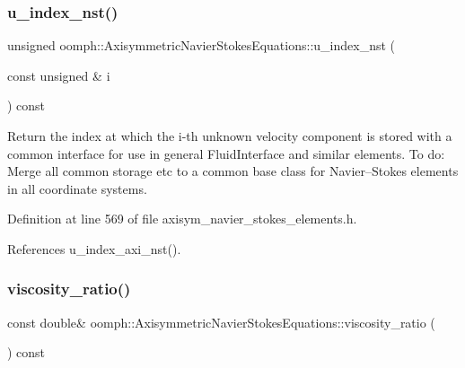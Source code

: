 \mbox{\label{classoomph_1_1AxisymmetricNavierStokesEquations_a14098e563e5329282612425f629eb196}} 
\subsubsection{\texorpdfstring{u\+\_\+index\+\_\+nst()}{u\_index\_nst()}}
{\footnotesize\ttfamily unsigned oomph\+::\+Axisymmetric\+Navier\+Stokes\+Equations\+::u\+\_\+index\+\_\+nst (\begin{DoxyParamCaption}\item[{const unsigned \&}]{i }\end{DoxyParamCaption}) const\hspace{0.3cm}{\ttfamily [inline]}}



Return the index at which the i-\/th unknown velocity component is stored with a common interface for use in general Fluid\+Interface and similar elements. To do\+: Merge all common storage etc to a common base class for Navier--Stokes elements in all coordinate systems. 



Definition at line 569 of file axisym\+\_\+navier\+\_\+stokes\+\_\+elements.\+h.



References u\+\_\+index\+\_\+axi\+\_\+nst().

\mbox{\label{classoomph_1_1AxisymmetricNavierStokesEquations_a4cf2dc737978f76fc7e0ad6358414f88}} 
\subsubsection{\texorpdfstring{viscosity\+\_\+ratio()}{viscosity\_ratio()}}
{\footnotesize\ttfamily const double\& oomph\+::\+Axisymmetric\+Navier\+Stokes\+Equations\+::viscosity\+\_\+ratio (\begin{DoxyParamCaption}{ }\end{DoxyParamCaption}) const\hspace{0.3cm}{\ttfamily [inline]}}



